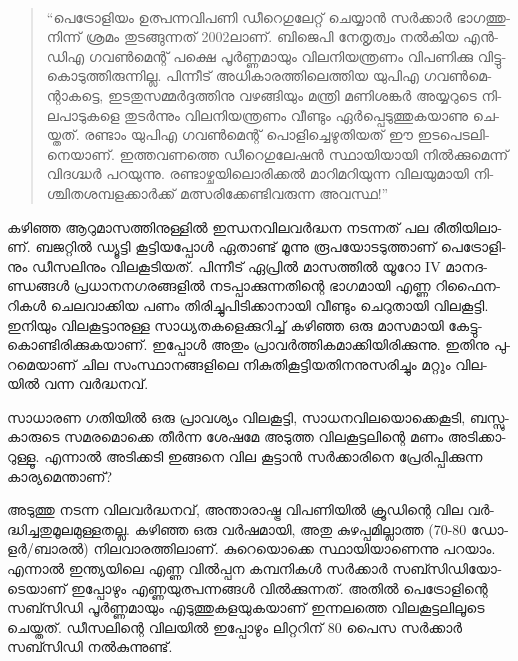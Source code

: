 \vskip 2pt

‌\begin{quotation}
``പെ­ട്രോ­ളി­യം ഉത്പ­ന്ന­വി­പ­ണി ഡീ­റെ­ഗു­ലേ­റ്റ് ചെ­യ്യാന്‍ സര്‍­ക്കാര്‍ ഭാ­ഗ­ത്തു­നി­ന്ന് ശ്ര­മം തു­ട­ങ്ങു­ന്ന­ത് 2002­ലാ­ണ്. 
ബി­ജെ­പി നേ­തൃ­ത്വം നല്‍­കിയ എന്‍­ഡി­എ­ ഗവണ്‍­മെ­ന്റ് പക്ഷെ പൂര്‍­ണ്ണ­മാ­യും ­വി­ല­നി­യ­ന്ത്ര­ണം­ വി­പ­ണി­ക്കു 
വി­ട്ടു­കൊ­ടു­ത്തി­രു­ന്നി­ല്ല. പി­ന്നീ­ട് അധി­കാ­ര­ത്തി­ലെ­ത്തിയ ­യു­പി­എ­ ഗവണ്‍­മെ­ന്റാ­ക­ട്ടെ, ഇട­തു­സ­മ്മര്‍­ദ്ദ­ത്തി­നു വഴ­ങ്ങി­യും 
മന്ത്രി മണി­ശ­ങ്കര്‍ അയ്യ­റു­ടെ നി­ല­പാ­ടു­ക­ളെ തു­ടര്‍­ന്നും വി­ല­നി­യ­ന്ത്ര­ണം വീ­ണ്ടും ഏര്‍­പ്പെ­ടു­ത്തു­ക­യാ­ണു ചെ­യ്ത­ത്. രണ്ടാം 
യു­പിഎ ഗവണ്‍­മെ­ന്റ് പൊ­ളി­ച്ചെ­ഴു­തി­യ­ത് ഈ ഇട­പെ­ട­ലി­നെ­യാ­ണ്. ഇത്ത­വ­ണ­ത്തെ ഡീ­റെ­ഗു­ലേ­ഷന്‍ സ്ഥാ­യി­യാ­യി
നില്‍­ക്കു­മെ­ന്ന് വി­ദ­ഗ്ദ്ധര്‍ പറ­യു­ന്നു. രണ്ടാ­ഴ്ച­യി­ലൊ­രി­ക്കല്‍ മാ­റി­മ­റി­യു­ന്ന വി­ല­യു­മാ­യി നി­ശ്ചി­ത­ശ­മ്പ­ള­ക്കാര്‍­ക്ക് 
മത്സ­രി­ക്കേ­ണ്ടി­വ­രു­ന്ന അവ­സ്ഥ!''
\end{quotation}

{\vskip 12pt}


­ക­ഴി­ഞ്ഞ ആറു­മാ­സ­ത്തി­നു­ള്ളില്‍ ഇന്ധ­ന­വി­ല­വര്‍­ദ്ധന നട­ന്ന­ത് പല രീ­തി­യി­ലാ­ണ്. ബജ­റ്റില്‍ ഡ്യൂ­ട്ടി കൂ­ട്ടി­യ­പ്പോള്‍ 
ഏതാ­ണ്ട് മൂ­ന്നു രൂ­പ­യോ­ട­ടു­ത്താ­ണ് പെ­ട്രോ­ളി­നും ഡീ­സ­ലി­നും വി­ല­കൂ­ടി­യ­ത്. പി­ന്നീ­ട് ഏപ്രില്‍ മാ­സ­ത്തില്‍ യൂ­റോ IV 
മാ­ന­ദ­ണ്ഡ­ങ്ങള്‍ പ്ര­ധാ­ന­ന­ഗ­ര­ങ്ങ­ളില്‍ നട­പ്പാ­ക്കു­ന്ന­തി­ന്റെ ഭാ­ഗ­മാ­യി എണ്ണ റി­ഫൈ­ന­റി­കള്‍ ചെ­ല­വാ­ക്കിയ പണം 
തി­രി­ച്ചു­പി­ടി­ക്കാ­നാ­യി വീ­ണ്ടും ചെ­റു­താ­യി വി­ല­കൂ­ട്ടി. ഇനി­യും വി­ല­കൂ­ട്ടാ­നു­ള്ള സാ­ധ്യ­ത­ക­ളെ­ക്കു­റി­ച്ച് കഴി­ഞ്ഞ ഒരു മാ­സ­മാ­യി
കേ­ട്ടു­കൊ­ണ്ടി­രി­ക്കു­ക­യാ­ണ്. ഇപ്പോള്‍ അതും പ്രാ­വര്‍­ത്തി­ക­മാ­ക്കി­യി­രി­ക്കു­ന്നു. ഇതി­നു പു­റ­മെ­യാ­ണ് ചില സം­സ്ഥാ­ന­ങ്ങ­ളി­ലെ
നി­കു­തി­കൂ­ട്ടി­യ­തി­ന­നു­സ­രി­ച്ചും മറ്റും വി­ല­യില്‍ വന്ന വര്‍­ദ്ധ­ന­വ്.

­സാ­ധാ­രണ ഗതി­യില്‍ ഒരു പ്രാ­വ­ശ്യം വി­ല­കൂ­ട്ടി, സാ­ധ­ന­വി­ല­യൊ­ക്കെ­കൂ­ടി, ബസ്സു­കാ­രു­ടെ സമ­ര­മൊ­ക്കെ തീര്‍­ന്ന 
ശേ­ഷ­മേ അടു­ത്ത വി­ല­കൂ­ട്ട­ലി­ന്റെ മണം അടി­ക്കാ­റു­ള്ളൂ. എന്നാല്‍ അടി­ക്ക­ടി ഇങ്ങ­നെ വില കൂ­ട്ടാന്‍ സര്‍­ക്കാ­രി­നെ 
പ്രേ­രി­പ്പി­ക്കു­ന്ന കാ­ര്യ­മെ­ന്താ­ണ്?

അ­ടു­ത്തു നട­ന്ന വി­ല­വര്‍­ദ്ധ­ന­വ്, അന്താ­രാ­ഷ്ട്ര വി­പ­ണി­യില്‍ ക്രൂ­ഡി­ന്റെ വില വര്‍­ദ്ധി­ച്ച­തു­മൂ­ല­മു­ള്ള­ത­ല്ല. കഴി­ഞ്ഞ ഒരു 
വര്‍­ഷ­മാ­യി, അതു കു­ഴ­പ്പ­മി­ല്ലാ­ത്ത (70-80 ഡോ­ളര്‍/­ബാ­രല്‍) നി­ല­വാ­ര­ത്തി­ലാ­ണ്. കു­റെ­യൊ­ക്കെ സ്ഥാ­യി­യാ­ണെ­ന്നു
പറ­യാം. എന്നാല്‍ ഇന്ത്യ­യി­ലെ എണ്ണ വില്‍­പ്പന കമ്പ­നി­കള്‍ സര്‍­ക്കാര്‍ സബ്സി­ഡി­യോ­ടെ­യാ­ണ് ഇപ്പോ­ഴും 
എണ്ണ­യു­ത്പ­ന്ന­ങ്ങള്‍ വില്‍­ക്കു­ന്ന­ത്. അതില്‍ പെ­ട്രോ­ളി­ന്റെ സബ്സി­ഡി പൂര്‍­ണ്ണ­മാ­യും എടു­ത്തു­ക­ള­യു­ക­യാ­ണ് 
ഇന്ന­ല­ത്തെ വി­ല­കൂ­ട്ട­ലി­ലൂ­ടെ ചെ­യ്ത­ത്. ഡീ­സ­ലി­ന്റെ വി­ല­യില്‍ ഇപ്പോ­ഴും ലി­റ്റ­റി­ന് 80 പൈസ സര്‍­ക്കാര്‍ 
സബ്സി­ഡി നല്‍­കു­ന്നു­ണ്ട്.

